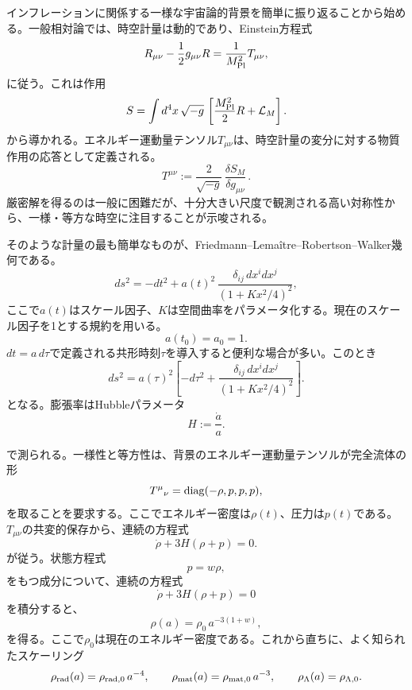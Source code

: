 \documentclass[a4paper,11pt,oneside]{article}
\theoremstyle{definition}
\numberwithin{equation}{section}
\begin{document}
インフレーションに関係する一様な宇宙論的背景を簡単に振り返ることから始める。一般相対論では、時空計量は動的であり、Einstein方程式
\begin{equation}
R_{\mu\nu}-\frac12 g_{\mu\nu}R=\frac{1}{M_{\rm Pl}^2}T_{\mu\nu},
\end{equation}
に従う。これは作用
\begin{equation}
S=\int d^4x\,\sqrt{-g}\,\left[\frac{M_{\rm Pl}^2}{2}R+\mathcal L_M\right].
\end{equation}
から導かれる。エネルギー運動量テンソル$ T_{\mu\nu}$は、時空計量の変分に対する物質作用の応答として定義される。
\begin{equation}
T^{\mu\nu}
:=
\frac{2}{\sqrt{-g}}\,
\frac{\delta S_M}{\delta g_{\mu\nu}} \, .
\end{equation}
厳密解を得るのは一般に困難だが、十分大きい尺度で観測される高い対称性から、一様・等方な時空に注目することが示唆される。



そのような計量の最も簡単なものが、Friedmann--Lema\^itre--Robertson--Walker幾何である。
\begin{equation}
ds^2=-dt^2+a(t)^2\,\frac{\delta_{ij}\,dx^i dx^j}{(1+Kx^2/4)^2},
\end{equation}
ここで\(a(t)\)はスケール因子、\(K\)は空間曲率をパラメータ化する。現在のスケール因子を1とする規約を用いる。
\begin{equation}
a(t_{0})=a_0=1 .
\end{equation}
\(dt=a\,d\tau\)で定義される共形時刻\(\tau\)を導入すると便利な場合が多い。このとき
\begin{equation}
ds^2=a(\tau)^2\left[-d\tau^2+\frac{\delta_{ij}\,dx^i dx^j}{(1+Kx^2/4)^2}\right].
\end{equation}
となる。膨張率はHubbleパラメータ
\begin{equation}
H:=\frac{\dot a}{a}.
\end{equation}


で測られる。一様性と等方性は、背景のエネルギー運動量テンソルが完全流体の形
\begin{equation}
T^\mu{}_\nu={\rm diag}(-\rho,p,p,p),
\end{equation}
を取ることを要求する。ここでエネルギー密度は\(\rho(t)\)、圧力は\(p(t)\)である。\(T_{\mu\nu}\)の共変的保存から、連続の方程式
\begin{equation}
\dot\rho+3H(\rho+p)=0.
\end{equation}
が従う。状態方程式
\begin{equation}
p=w\rho ,
\end{equation}
をもつ成分について、連続の方程式
\begin{equation}
\dot\rho+3H(\rho+p)=0
\end{equation}
を積分すると、
\begin{equation}
\rho(a)=\rho_0\,a^{-3(1+w)} ,
\end{equation}
を得る。ここで\(\rho_0\)は現在のエネルギー密度である。これから直ちに、よく知られたスケーリング
\begin{equation}
\rho_{\rm rad}(a)=\rho_{{\rm rad},0}\,a^{-4},
\qquad
\rho_{\rm mat}(a)=\rho_{{\rm mat},0}\,a^{-3},
\qquad
\rho_\Lambda(a)=\rho_{\Lambda,0} .
\end{equation}
\end{document}
